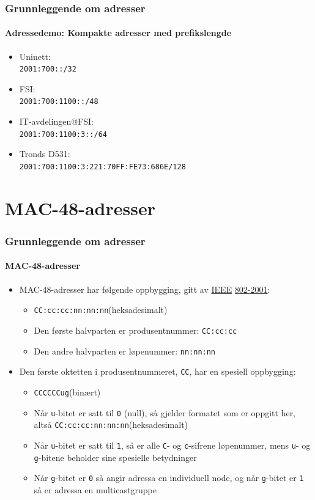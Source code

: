 \begin{frame}%
  \frametitle{Grunnleggende om adresser}
  \framesubtitle{Adressedemo: Kompakte adresser med prefikslengde}
  \begin{itemize}%
  \item Uninett:\\\texttt{2001:700::/32}
  \item FSI:\\\texttt{2001:700:1100::/48}
  \item IT-avdelingen@FSI:\\\texttt{2001:700:1100:3::/64}
  \item Tronds D531:\\\texttt{2001:700:1100:3:221:70FF:FE73:686E/128}
  \end{itemize}
\end{frame}

\section{MAC-48-adresser}
\begin{frame}%
  \frametitle{Grunnleggende om adresser}
  \framesubtitle{MAC-48-adresser}
  \pause
  \begin{itemize}[<+->]
  \item MAC-48-adresser har følgende oppbygging, gitt av
    \href{http://www.ieee.org/index.html}{IEEE}
    \href{http://standards.ieee.org/getieee802/download/802-2001.pdf}{802-2001}:
    \begin{itemize}[<+->]
    \item \texttt{CC:cc:cc:nn:nn:nn}\hfill(heksadesimalt)
    \item Den første halvparten er produsentnummer: \texttt{CC:cc:cc}
    \item Den andre halvparten er løpenummer: \texttt{nn:nn:nn}
    \end{itemize}
  \item Den første oktetten i produsentnummeret, \texttt{CC}, har en
    spesiell oppbygging:
    \begin{itemize}[<+->]
    \item \texttt{CCCCCC\alert{ug}}\hfill(binært)
    \item Når \texttt{u}-bitet er satt til \texttt{0} (null), så
      gjelder formatet som er oppgitt her, altså
      \texttt{CC:cc:cc:nn:nn:nn}\hfill(heksadesimalt)
    \item Når \texttt{u}-bitet er satt til \texttt{1}, så er alle
      \texttt{C}- og \texttt{c}-sifrene løpenummer, mens \texttt{u}-
      og \texttt{g}-bitene beholder sine spesielle betydninger
    \item Når \texttt{g}-bitet er \texttt{0} så angir adressa en
      individuell node, og når \texttt{g}-bitet er \texttt{1} så er
      adressa en multicastgruppe
    \end{itemize}
  \end{itemize}
\end{frame}

